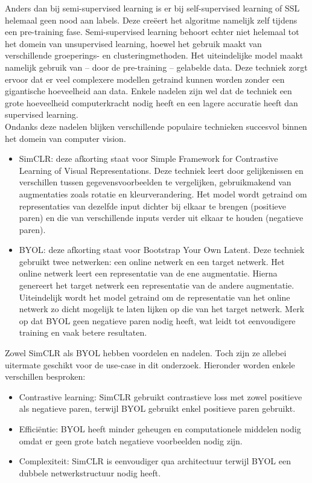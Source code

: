 Anders dan bij semi-supervised learning is er bij self-supervised learning of SSL helemaal geen nood aan labels. Deze creëert het algoritme namelijk zelf tijdens een pre-training fase. Semi-supervised learning behoort echter niet helemaal tot het domein van unsupervised learning, hoewel het gebruik maakt van verschillende groeperings- en clusteringmethoden. Het uiteindelijke model maakt namelijk gebruik van -- door de pre-training -- gelabelde data. Deze techniek zorgt ervoor dat er veel complexere modellen getraind kunnen worden zonder een gigantische hoeveelheid aan data. Enkele nadelen zijn wel dat de techniek een grote hoeveelheid computerkracht nodig heeft en een lagere accuratie heeft dan supervised learning. \autocite{Gui_2024} \\

Ondanks deze nadelen blijken verschillende populaire technieken succesvol binnen het domein van computer vision.

\begin{itemize}
    \item SimCLR: deze afkorting staat voor Simple Framework for Contrastive Learning of Visual Representations. Deze techniek leert door gelijkenissen en verschillen tussen gegevensvoorbeelden te vergelijken, gebruikmakend van augmentaties zoals rotatie en kleurverandering. Het model wordt getraind om representaties van dezelfde input dichter bij elkaar te brengen (positieve paren) en die van verschillende inputs verder uit elkaar te houden (negatieve paren). \autocite{Chen_2020}
    \item BYOL: deze afkorting staat voor Bootstrap Your Own Latent. Deze techniek gebruikt twee netwerken: een online netwerk en een target netwerk. Het online netwerk leert een representatie van de ene augmentatie. Hierna genereert het target netwerk een representatie van de andere augmentatie. Uiteindelijk wordt het model getraind om de representatie van het online netwerk zo dicht mogelijk te laten lijken op die van het target netwerk. Merk op dat BYOL geen negatieve paren nodig heeft, wat leidt tot eenvoudigere training en vaak betere resultaten. \autocite{Grill_2020}
\end{itemize}

Zowel SimCLR als BYOL hebben voordelen en nadelen. Toch zijn ze allebei uitermate geschikt voor de use-case in dit onderzoek. Hieronder worden enkele verschillen besproken:

\begin{itemize}
    \item Contrastive learning: SimCLR gebruikt contrastieve loss met zowel positieve als negatieve paren, 
    terwijl BYOL gebruikt enkel positieve paren gebruikt.
    \item Efficiëntie: BYOL heeft minder geheugen en computationele middelen nodig omdat er geen grote batch negatieve voorbeelden nodig zijn.
    \item Complexiteit: SimCLR is eenvoudiger qua architectuur terwijl BYOL een dubbele netwerkstructuur nodig heeft.
\end{itemize}

